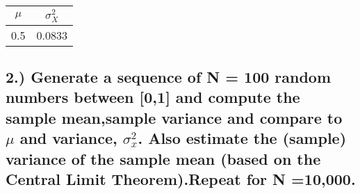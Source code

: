 \documentclass[11pt]{article}
\begin{document}
\begin{longtable}[]{@{}cc@{}}
\toprule
\(\mu\) & \(\sigma_X^2\)\tabularnewline
\midrule
\endhead
0.5 & 0.0833\tabularnewline
\bottomrule
\end{longtable}

    \subsection{\texorpdfstring{2.) Generate a sequence of N = 100 random
numbers between {[}0,1{]} and compute the sample mean,sample variance
and compare to \(\mu\) and variance, \(\sigma_x^2\). Also estimate the
(sample) variance of the sample mean (based on the Central Limit
Theorem).Repeat for N
=10,000.}{2.) Generate a sequence of N = 100 random numbers between {[}0,1{]} and compute the sample mean,sample variance and compare to \textbackslash{}mu and variance, \textbackslash{}sigma\_x\^{}2. Also estimate the (sample) variance of the sample mean (based on the Central Limit Theorem).Repeat for N =10,000.}}\label{generate-a-sequence-of-n-100-random-numbers-between-01-and-compute-the-sample-meansample-variance-and-compare-to-mu-and-variance-sigma_x2.-also-estimate-the-sample-variance-of-the-sample-mean-based-on-the-central-limit-theorem.repeat-for-n-10000.}
\end{document}
